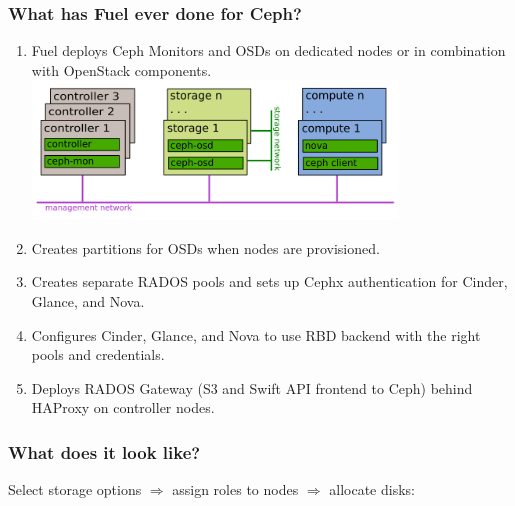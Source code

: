 \documentclass[hyperref=unicode,utf8,xcolor=pst]{beamer}
\begin{document}
\begin{frame}
	\frametitle{What has Fuel ever done for Ceph?}
	\begin{enumerate}
		\item Fuel deploys Ceph Monitors and OSDs on dedicated
			nodes or in combination with OpenStack
			components.\\
			\includegraphics[height=3.7cm]{openstack-nodes}
		\item Creates partitions for OSDs when nodes are
			provisioned.
		\item Creates separate RADOS pools and sets up Cephx
			authentication for Cinder, Glance, and Nova.
		\item Configures Cinder, Glance, and Nova to use RBD
			backend with the right pools and credentials.
		\item Deploys RADOS Gateway (S3 and Swift API frontend
			to Ceph) behind HAProxy on controller nodes.
	\end{enumerate}
\end{frame}

\begin{frame}
	\frametitle{What does it look like?}
	Select storage options $\Rightarrow$ assign roles to nodes $\Rightarrow$ allocate disks:\\
	\vspace{3ex}
\end{frame}
\end{document}
